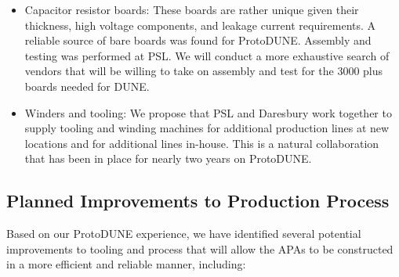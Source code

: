 \begin{itemize}
\item Capacitor resistor boards: These boards are rather unique given their thickness, high voltage components, and leakage current requirements. A reliable source of bare boards was found for ProtoDUNE. Assembly and testing was performed at PSL. We will conduct a more exhaustive search of vendors that will be willing to take on assembly and test for the 3000 plus boards needed for DUNE.

\item Winders and tooling: We propose that PSL and Daresbury work together to supply tooling and winding machines for additional production lines at new locations and for additional lines in-house. This is a natural collaboration that has been in place for nearly two years on ProtoDUNE.

\end{itemize}


\subsection{Planned Improvements to Production Process}

Based on our ProtoDUNE experience, we have identified several potential improvements to tooling and process that will allow the APAs to be constructed in a more efficient and reliable manner, including:

